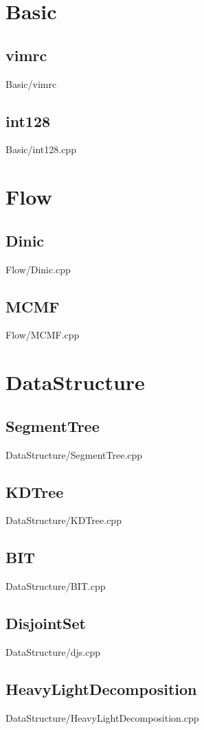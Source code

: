 \section{Basic}
    \subsection{vimrc}
         {Basic/vimrc}
    \subsection{int128}
         {Basic/int128.cpp}

\section{Flow}
    \subsection{Dinic}
         {Flow/Dinic.cpp}
    \subsection{MCMF}
         {Flow/MCMF.cpp}

\section{DataStructure}
    \subsection{SegmentTree}
         {DataStructure/SegmentTree.cpp}
    \subsection{KDTree}
         {DataStructure/KDTree.cpp}
    \subsection{BIT}
         {DataStructure/BIT.cpp}
    \subsection{DisjointSet}
         {DataStructure/djs.cpp}
    \subsection{HeavyLightDecomposition}
         {DataStructure/HeavyLightDecomposition.cpp}
